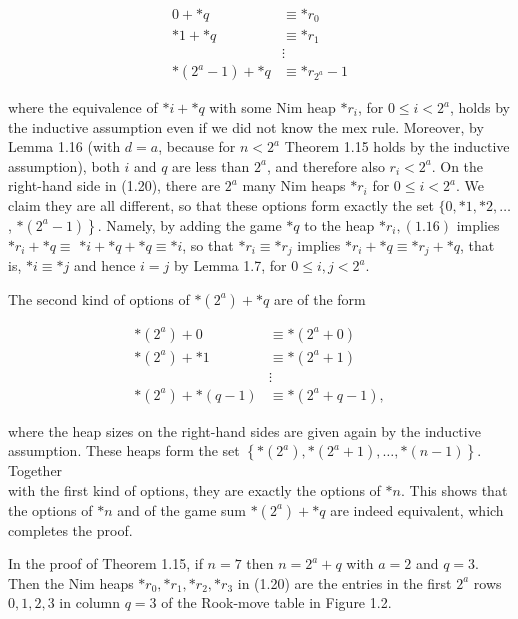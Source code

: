 \documentclass[12pt]{article}
\begin{document}
\begin{align*}
0+* q & \equiv * r_{0} \\
* 1+* q & \equiv * r_{1} \\
& \vdots  \tag{1.20}\\
*\left(2^{a}-1\right)+* q & \equiv * r_{2^{a}}-1
\end{align*}


where the equivalence of $* i+* q$ with some Nim heap $* r_{i}$, for $0 \leq i<2^{a}$, holds by the inductive assumption even if we did not know the mex rule. Moreover, by Lemma 1.16 (with $d=a$, because for $n<2^{a}$ Theorem 1.15 holds by the inductive assumption), both $i$ and $q$ are less than $2^{a}$, and therefore also $r_{i}<2^{a}$. On the right-hand side in (1.20), there are $2^{a}$ many Nim heaps $* r_{i}$ for $0 \leq i<2^{a}$. We claim they are all different, so that these options form exactly the set $\{0, * 1, * 2, \ldots$, $\left.*\left(2^{a}-1\right)\right\}$. Namely, by adding the game $* q$ to the heap $* r_{i},(1.16)$ implies $* r_{i}+* q \equiv$ $* i+* q+* q \equiv * i$, so that $* r_{i} \equiv * r_{j}$ implies $* r_{i}+* q \equiv * r_{j}+* q$, that is, $* i \equiv * j$ and hence $i=j$ by Lemma 1.7, for $0 \leq i, j<2^{a}$.

The second kind of options of $*\left(2^{a}\right)+* q$ are of the form

$$
\begin{aligned}
*\left(2^{a}\right)+0 & \equiv *\left(2^{a}+0\right) \\
*\left(2^{a}\right)+* 1 & \equiv *\left(2^{a}+1\right) \\
& \vdots \\
*\left(2^{a}\right)+*(q-1) & \equiv *\left(2^{a}+q-1\right),
\end{aligned}
$$

where the heap sizes on the right-hand sides are given again by the inductive assumption. These heaps form the set $\left\{*\left(2^{a}\right), *\left(2^{a}+1\right), \ldots, *(n-1)\right\}$. Together\\
with the first kind of options, they are exactly the options of $* n$. This shows that the options of $* n$ and of the game sum $*\left(2^{a}\right)+* q$ are indeed equivalent, which completes the proof.

In the proof of Theorem 1.15, if $n=7$ then $n=2^{a}+q$ with $a=2$ and $q=3$. Then the Nim heaps $* r_{0}, * r_{1}, * r_{2}, * r_{3}$ in (1.20) are the entries in the first $2^{a}$ rows $0,1,2,3$ in column $q=3$ of the Rook-move table in Figure 1.2.
\end{document}
